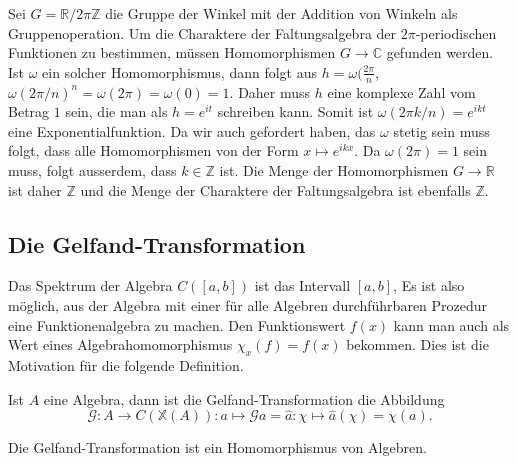 \begin{beispiel}
Sei $G= \mathbb{R}/2\pi\mathbb{Z}$ die Gruppe der Winkel mit der 
Addition von Winkeln als Gruppenoperation.
Um die Charaktere der Faltungsalgebra der $2\pi$-periodischen Funktionen
zu bestimmen, müssen Homomorphismen $G\to\mathbb{C}$ gefunden werden.
Ist $\omega$ ein solcher Homomorphismus, dann folgt aus
$h=\omega(\frac{2\pi}{n}$, $\omega(2\pi/n)^n = \omega(2\pi)=\omega(0)=1$.
Daher muss $h$ eine komplexe Zahl vom Betrag $1$ sein, die man als
$h=e^{it}$ schreiben kann.
Somit ist $\omega(2\pi k/n) = e^{ikt}$ eine Exponentialfunktion.
Da wir auch gefordert haben, das $\omega$ stetig sein muss folgt,
dass alle Homomorphismen von der Form $x\mapsto e^{ikx}$.
Da $\omega(2\pi)=1$ sein muss, folgt ausserdem, dass $k\in \mathbb{Z}$
ist.
Die Menge der Homomorphismen $G\to\mathbb{R}$ ist daher $\mathbb{Z}$ und
die Menge der Charaktere der Faltungsalgebra ist ebenfalls $\mathbb{Z}$.
\end{beispiel}


%
%
\subsection{Die Gelfand-Transformation}
Das Spektrum der Algebra $C([a,b])$ ist das Intervall $[a,b]$,
Es ist also möglich, aus der Algebra mit einer für alle Algebren
durchführbaren Prozedur eine Funktionenalgebra zu machen.
Den Funktionswert $f(x)$  kann man auch als Wert eines 
Algebrahomomorphismus $\chi_x(f) = f(x)$ bekommen.
Dies ist die Motivation für die folgende Definition.

\begin{definition}
Ist $A$ eine Algebra, dann ist die Gelfand-Transformation
die Abbildung
\[
\mathscr{G}
\colon
A \to C(\mathbb{X}(A))
:
a
\mapsto \mathscr{G}a = \hat{a}
\colon \chi \mapsto \hat{a}(\chi) = \chi(a).
\]
\end{definition}

\begin{satz}
Die Gelfand-Transformation ist ein Homomorphismus von Algebren.
\end{satz}


